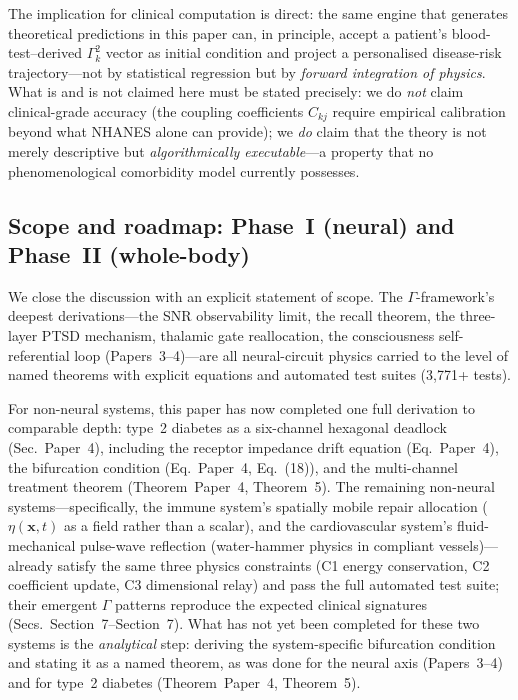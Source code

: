 \documentclass[aps,pre,twocolumn,superscriptaddress,floatfix]{revtex4-2}
\begin{document}
The implication for clinical computation is direct:
the same engine that generates theoretical predictions
in this paper can, in principle, accept a patient's
blood-test--derived $\Gamma_k^2$ vector as initial
condition and project a personalised
disease-risk trajectory---not by
statistical regression but by
\emph{forward integration of physics}.
What is and is not claimed here
must be stated precisely:
we do \emph{not} claim clinical-grade accuracy
(the coupling coefficients $C_{kj}$ require
empirical calibration beyond what NHANES alone
can provide); we \emph{do} claim that the
theory is not merely descriptive but
\emph{algorithmically executable}---a property
that no phenomenological comorbidity model
currently possesses.

\subsection{Scope and roadmap:
  Phase~I (neural) and Phase~II (whole-body)}
\label{sec:scope-roadmap}

We close the discussion with an explicit
statement of scope.
The $\Gamma$-framework's deepest derivations---the
SNR observability limit, the recall theorem,
the three-layer PTSD mechanism, thalamic gate
reallocation, the consciousness self-referential
loop (Papers~3--4)---are all neural-circuit physics
carried to the level of named theorems with
explicit equations and automated test suites
(3,771+ tests).

For non-neural systems, this paper has now
completed one full derivation to comparable depth:
type~2 diabetes as a six-channel hexagonal
deadlock (Sec.~Paper~4),
including the receptor impedance drift equation
(Eq.~Paper~4), the bifurcation condition
(Eq.~Paper~4, Eq.~(18)), and the
multi-channel treatment theorem
(Theorem~Paper~4, Theorem~5).
The remaining non-neural systems---specifically,
the immune system's spatially mobile repair
allocation ($\eta(\mathbf{x}, t)$ as a field
rather than a scalar), and the cardiovascular
system's fluid-mechanical pulse-wave reflection
(water-hammer physics in compliant vessels)---already
satisfy the same three physics constraints
(C1 energy conservation, C2 coefficient update,
C3 dimensional relay) and pass the
full automated test suite;
their emergent $\Gamma$ patterns reproduce
the expected clinical signatures
(Secs.~Section~7--Section~7).
What has not yet been completed for these two
systems is the \emph{analytical} step:
deriving the system-specific bifurcation
condition and stating it as a named theorem,
as was done for the neural axis
(Papers~3--4) and for type~2 diabetes
(Theorem~Paper~4, Theorem~5).
\end{document}
